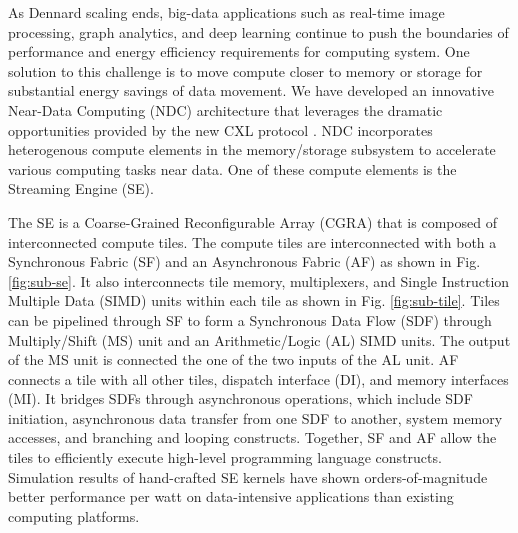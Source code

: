 As Dennard scaling ends, big-data applications such as real-time image processing, graph analytics, and deep learning continue to push the boundaries of performance and energy efficiency requirements for computing system. 
One solution to this challenge is to move compute closer to memory or storage for substantial energy savings of data movement. 
We have developed an innovative Near-Data Computing (NDC) architecture that leverages the dramatic opportunities provided by the new CXL protocol \cite{sharma2020compute}. 
NDC incorporates heterogenous compute elements in the memory/storage subsystem to accelerate various computing tasks near data. 
One of these compute elements is the Streaming Engine (SE).

The SE is a Coarse-Grained Reconfigurable Array (CGRA) that is composed of interconnected compute tiles.  
The compute tiles are interconnected with both a Synchronous Fabric (SF) and an Asynchronous Fabric (AF) as shown in Fig. \ref{fig:sub-se}.
It also interconnects tile memory, multiplexers, and Single Instruction Multiple Data (SIMD) units within each tile as shown in Fig. \ref{fig:sub-tile}. 
Tiles can be pipelined through SF to form a Synchronous Data Flow (SDF) through Multiply/Shift (MS) unit and an Arithmetic/Logic (AL) SIMD units. 
The output of the MS unit is connected the one of the two inputs of the AL unit.
AF connects a tile with all other tiles, dispatch interface (DI), and memory interfaces (MI).
It bridges SDFs through asynchronous operations, which include SDF initiation, asynchronous data transfer from one SDF to another, system memory accesses, and branching and looping constructs. 
Together, SF and AF allow the tiles to efficiently execute high-level programming language constructs.
Simulation results of hand-crafted SE kernels have shown orders-of-magnitude better performance per watt on data-intensive applications than existing computing platforms.

